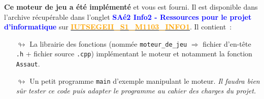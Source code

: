\documentclass[10pt, fleqn, a4paper]{article}
\newcommand{\bfcolor}[2]{\textcolor{#1}{\textbf{#2}}}
\newcommand\myframecolor{}
\newcommand\mybgcolor{}
\newenvironment{mycolorbox}[2]
{
\def\myframecolor{#1}
\def\mybgcolor{#2}
\begingroup
\begin{lrbox}{\mytextbox}
\begin{minipage}[t]{\textwidth}
}
{
\end{minipage}\end{lrbox}
\fcolorbox{\myframecolor}{\mybgcolor}{\usebox{\mytextbox}}
\endgroup
}
\def\ESPACEINFO1{\href{https://claroline-connect.univ-st-etienne.fr/web/app.php/workspaces/41547/open?toolName=home}{\bfcolor{orange}{IUTSEGEII\_S1\_M1103\_INFO1}}}
\begin{document}
\begin{mycolorbox}{black}{yellow}
\textbf{Ce moteur de jeu a été implémenté} et vous est fourni. Il est disponible dans l'archive  récupérable dans l'onglet \bfcolor{blue}{SAé2 Info2 - Ressources pour le projet d'informatique} sur \ESPACEINFO1. Il contient~:
\begin{itemize}
\item[$\looparrowright$] La librairie des fonctions (nommée \texttt{moteur\_de\_jeu} $\Rightarrow$ fichier d'en-tête \texttt{.h} + fichier source \texttt{.cpp}) implémentant le moteur et notamment la fonction \texttt{Assaut}.
\item[$\looparrowright$]  Un petit programme \texttt{main} d'exemple manipulant le moteur. \textit{Il faudra bien sûr tester ce code puis adapter le programme au cahier des charges du projet.}
\end{itemize}
\end{mycolorbox}
\end{document}
